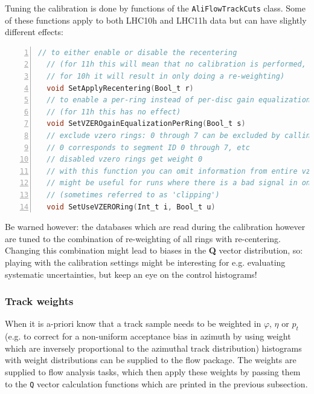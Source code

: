\documentclass[a4paper]{book}
\numberwithin{equation}{subsection}
\begin{document}
\begin{description}
Tuning the calibration is done by functions of the \texttt{AliFlowTrackCuts} class. Some of these functions apply to both LHC10h and LHC11h data but can have slightly different effects:
\begin{lstlisting}[language=C, numbers=left]
  // to either enable or disable the recentering 
  // (for 11h this will mean that no calibration is performed,
  // for 10h it will result in only doing a re-weighting)
  void SetApplyRecentering(Bool_t r)
  // to enable a per-ring instead of per-disc gain equalization (=re-weighting)
  // (for 11h this has no effect)
  void SetVZEROgainEqualizationPerRing(Bool_t s)   
  // exclude vzero rings: 0 through 7 can be excluded by calling this setter multiple times
  // 0 corresponds to segment ID 0 through 7, etc
  // disabled vzero rings get weight 0
  // with this function you can omit information from entire vzero rings
  // might be useful for runs where there is a bad signal in one of the tiles
  // (sometimes referred to as 'clipping')
  void SetUseVZERORing(Int_t i, Bool_t u)\end{lstlisting}
Be warned however: the databases which are read during the calibration however are tuned to the combination of re-weighting of all rings with re-centering. Changing this combination might lead to biases in the \textbf{Q} vector distribution, so: playing with the calibration settings might be interesting for e.g. evaluating systematic uncertainties, but keep an eye on the control histograms!
\end{description}

\subsubsection{Track weights}
When it is a-priori know that a track sample needs to be weighted in $\varphi$, $\eta$ or $p_t$ (e.g. to correct for a non-uniform acceptance bias in azimuth by using weight which are inversely proportional to the azimuthal track distribution) histograms with weight distributions can be supplied to the flow package. The weights are supplied to flow analysis tasks, which then apply these weights by passing them to the \texttt{Q} vector calculation functions which are printed in the previous subsection. 
\end{document}
